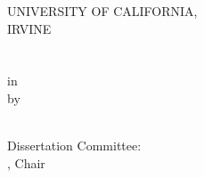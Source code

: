 \documentclass[onecolumn]{article}
\newcommand{\thesistitlepage}
{
	\vspace*{0.5in}
	\thispagestyle{empty}
	\begin{center}
		UNIVERSITY OF CALIFORNIA, \\
		IRVINE \\
		\vspace{0.4in}
		\Thesistitle \\
		\vspace{0.4in}
		\MakeUppercase\Degreename \\
		\vspace{0.15in}
		in \Degreefield \\
		\vspace{0.4in}
		by \\
		\vspace{0.4in}
		\Authorname \\
	\end{center}
	\vspace{3in}
	\begin{flushright}
		Dissertation Committee: \\
		\Committeechair, Chair \\
		\Othercommitteemembers \\
	\end{flushright}
	\vfill
	\clearpage
}
\begin{document}


\thesistitlepage
\newpage

\tableofcontents

\newpage



%

\graphicspath{{Background/}}



\graphicspath{{ModelDevelopment/}}



\graphicspath{{Results/LocalStructuring/}}



\graphicspath{{Results/Electrostatics/}}



\graphicspath{{Results/SimultaneousBinding/}}



\graphicspath{{Results/SurfaceEffects/}}



\graphicspath{{Timeline/}}




%







\end{document}
